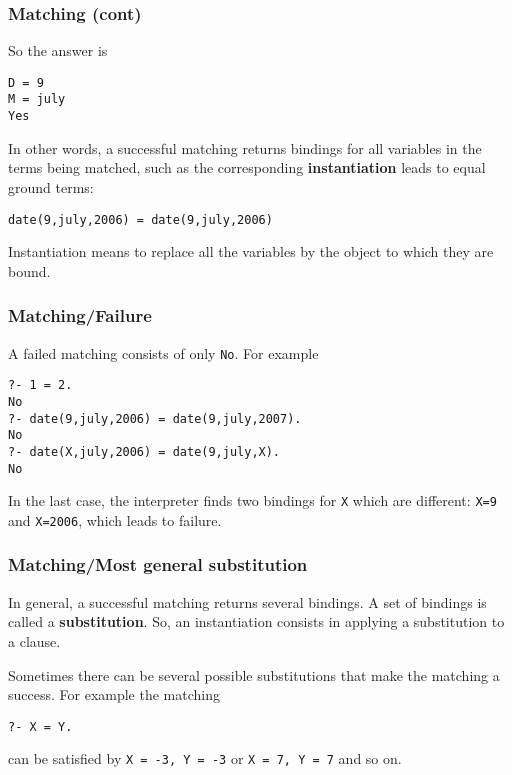 %
\begin{frame}[containsverbatim]
\frametitle{Matching (cont)}

So the answer is
{\small
\begin{verbatim}
D = 9
M = july
Yes
\end{verbatim}
}
In other words, a successful matching returns bindings for all
variables in the terms being matched, such as the corresponding
\textbf{instantiation} leads to equal ground terms:
{\small
\begin{verbatim}
date(9,july,2006) = date(9,july,2006)
\end{verbatim}
}
Instantiation means to replace all the variables by the object
to which they are bound.

\end{frame}

%
\begin{frame}[containsverbatim]
\frametitle{Matching/Failure}

A failed matching consists of only \texttt{No}. For example
{\small
\begin{verbatim}
?- 1 = 2.
No
?- date(9,july,2006) = date(9,july,2007).
No
?- date(X,july,2006) = date(9,july,X).
No
\end{verbatim}
}
In the last case, the interpreter finds two bindings for \texttt{X}
which are different: \texttt{X=9} and \texttt{X=2006}, which leads to
failure.

\end{frame}

%
\begin{frame}[containsverbatim]
\frametitle{Matching/Most general substitution}

In general, a successful matching returns several bindings. A set of
bindings is called a \textbf{substitution}. So, an instantiation
consists in applying a substitution to a clause.

\bigskip

Sometimes there can be several possible substitutions that make the
matching a success. For example the matching
{\small
\begin{verbatim}
?- X = Y.
\end{verbatim}
}
can be satisfied by
{\small \verb|X = -3, Y = -3|} or {\small \verb|X = 7, Y = 7|}
and so on.

\end{frame}

